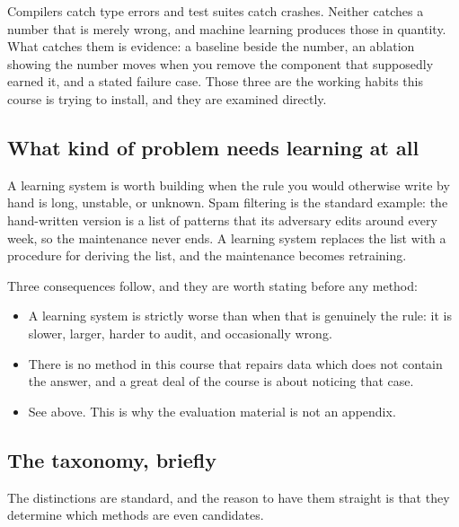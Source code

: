 \documentclass[11pt,a4paper]{article}
\begin{document}
Compilers catch type errors and test suites catch crashes. Neither catches a
number that is merely wrong, and machine learning produces those in quantity.
What catches them is evidence: a baseline beside the number, an ablation
showing the number moves when you remove the component that supposedly earned
it, and a stated failure case. Those three are the working habits this course
is trying to install, and they are examined directly.

\subsection{What kind of problem needs learning at all}

A learning system is worth building when the rule you would otherwise write by
hand is long, unstable, or unknown. Spam filtering is the standard example:
the hand-written version is a list of patterns that its adversary edits around
every week, so the maintenance never ends. A learning system replaces the list
with a procedure for deriving the list, and the maintenance becomes retraining.

Three consequences follow, and they are worth stating before any method:

\begin{itemize}[leftmargin=1.4em,itemsep=2pt]
  \item {} A learning system is
        strictly worse than  when that is genuinely the
        rule: it is slower, larger, harder to audit, and occasionally wrong.
  \item {} There is no
        method in this course that repairs data which does not contain the
        answer, and a great deal of the course is about noticing that case.
  \item {} See above. This is why the evaluation
        material is not an appendix.
\end{itemize}

\subsection{The taxonomy, briefly}

The distinctions are standard, and the reason to have them straight is that
they determine which methods are even candidates.
\end{document}
